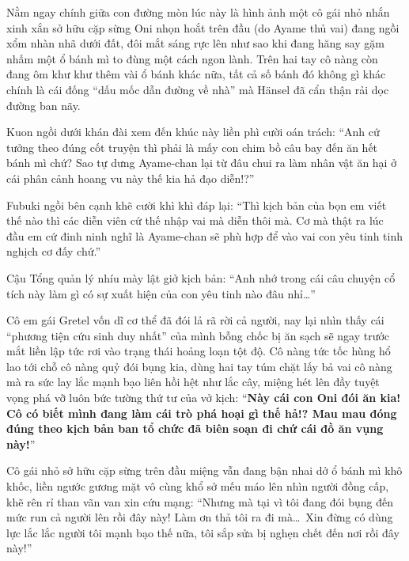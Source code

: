 \documentclass[../main.tex]{subfiles}
\begin{document}
Nằm ngay chính giữa con đường mòn lúc này là hình ảnh một cô gái nhỏ nhắn xinh xắn sở hữu cặp sừng Oni nhọn hoắt trên đầu (do Ayame thủ vai) đang ngồi xổm nhàn nhã dưới đất, đôi mắt sáng rực lên như sao khi đang hăng say gặm nhấm một ổ bánh mì to đùng một cách ngon lành. Trên hai tay cô nàng còn đang ôm khư khư thêm vài ổ bánh khác nữa, tất cả số bánh đó không gì khác chính là cái đống ``dấu mốc dẫn đường về nhà'' mà Hänsel đã cẩn thận rải dọc đường ban nãy.


\il

Kuon ngồi dưới khán đài xem đến khúc này liền phì cười oán trách: ``Anh cứ tưởng theo đúng cốt truyện thì phải là mấy con chim bồ câu bay đến ăn hết bánh mì chứ? Sao tự dưng Ayame-chan lại từ đâu chui ra làm nhân vật ăn hại ở cái phân cảnh hoang vu này thế kia hả đạo diễn!?''

Fubuki ngồi bên cạnh khẽ cười khì khì đáp lại: ``Thì kịch bản của bọn em viết thế nào thì các diễn viên cứ thế nhập vai mà diễn thôi mà. Cơ mà thật ra lúc đầu em cứ đinh ninh nghĩ là Ayame-chan sẽ phù hợp để vào vai con yêu tinh tinh nghịch cơ đấy chứ.''

Cậu Tổng quản lý nhíu mày lật giở kịch bản: ``Anh nhớ trong cái câu chuyện cổ tích này làm gì có sự xuất hiện của con yêu tinh nào đâu nhỉ\dots''

\il

Cô em gái Gretel vốn dĩ cơ thể đã đói lả rã rời cả người, nay lại nhìn thấy cái ``phương tiện cứu sinh duy nhất'' của mình bỗng chốc bị ăn sạch sẽ ngay trước mắt liền lập tức rơi vào trạng thái hoảng loạn tột độ. Cô nàng tức tốc hùng hổ lao tới chỗ cô nàng quỷ đói bụng kia, dùng hai tay túm chặt lấy bả vai cô nàng mà ra sức lay lắc mạnh bạo liên hồi hệt như lắc cây, miệng hét lên đầy tuyệt vọng phá vỡ luôn bức tường thứ tư của vở kịch: ``\textbf{Này cái con Oni đói ăn kia! Cô có biết mình đang làm cái trò phá hoại gì thế hả!? Mau mau đóng đúng theo kịch bản ban tổ chức đã biên soạn đi chứ cái đồ ăn vụng này!}''

Cô gái nhỏ sở hữu cặp sừng trên đầu miệng vẫn đang bận nhai dở ổ bánh mì khô khốc, liền ngước gương mặt vô cùng khổ sở mếu máo lên nhìn người đồng cấp, khẽ rên rỉ than vãn van xin cứu mạng: ``Nhưng mà tại vì tôi đang đói bụng đến mức run cả người lên rồi đây này! Làm ơn thả tôi ra đi mà\dots\ Xin đừng có dùng lực lắc lắc người tôi mạnh bạo thế nữa, tôi sắp sửa bị nghẹn chết đến nơi rồi đây này!''

\end{document}

